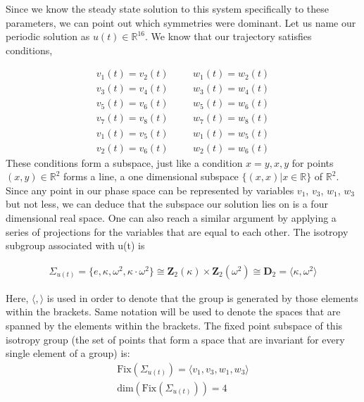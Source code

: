 Since we know the steady state solution to this system specifically to these parameters, we can point out which symmetries were dominant. Let us name our periodic solution as $u(t) \in \mathbb{R}^{16}$. We know that our trajectory satisfies conditions, 

\begin{align}
\nonumber v_1(t) = v_2(t)\;\; \;&\;\;\; w_1(t) = w_2(t)\\
\nonumber v_3(t) = v_4(t)\;\; \;&\;\;\; w_3(t) = w_4(t)\\
\nonumber v_5(t) = v_6(t)\;\; \;&\;\;\; w_5(t) = w_6(t)\\
v_7(t) = v_8(t)\;\; \;&\;\;\; w_7(t) = w_8(t)\\
\nonumber v_1(t) = v_5(t)\;\; \;&\;\;\; w_1(t) = w_5(t)\\
\nonumber v_2(t) = v_6(t)\;\; \;&\;\;\; w_2(t) = w_6(t)
\end{align}
These conditions form a subspace, just like a condition $x=y , x,y $ for points $(x,y) \in \mathbb{R}^2$ forms a line, a one dimensional subspace $\{(x,x) | x \in \mathbb{R}\}$ of $\mathbb{R}^2$. Since any point in our phase space can be represented by variables $v_1$, $v_3$, $w_1$, $w_3$ but not less, we can deduce that the subspace our solution lies on is a four dimensional real space. One can also reach a similar argument by applying a series of projections for the variables that are equal to each other. The isotropy subgroup associated with u(t) is

\begin{align}
\Sigma_{u(t)} = \{e,\kappa,\omega^2,\kappa \cdot \omega^2 \} \cong \mathbf{Z}_2(\kappa) \times \mathbf{Z}_2(\omega^2) \cong \mathbf{D}_2  = \langle \kappa, \omega^2 \rangle
\end{align}

Here, $\langle ,\rangle$ is used in order to denote that the group is generated by those elements within the brackets. Same notation will be used to denote the spaces that are spanned by the elements within the brackets.  The fixed point subspace of this isotropy group (the set of points that form a space that are invariant for every single element of a group) is:
\begin{align}
\text{Fix} \left(\Sigma_{u(t)}\right) = \langle v_1,v_3,w_1,w_3 \rangle \\
\text{dim} \left(\text{Fix}\left(\Sigma_{u(t)}\right)\right) = 4
\end{align}

